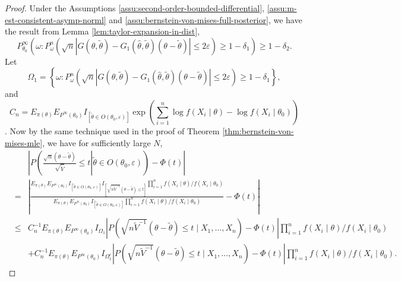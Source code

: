 \begin{proof}
Under the Assumptions \ref{assu:second-order-bounded-differential},
\ref{assu:m-est-consistent-asymp-norml} and \ref{assu:bernstein-von-mises-full-posterior},
we have the result from Lemma \ref{lem:taylor-expansion-in-dist},
\begin{equation}
P_{\theta_{0}}^{\infty}\left(\omega:P_{\omega}^{n}\left(\sqrt{n}\left|G\left(\theta,\tilde{\theta}\right)-G_{1}\left(\hat{\theta},\tilde{\theta}\right)\left(\theta-\tilde{\theta}\right)\right|\le2\varepsilon\right)\ge1-\delta_{1}\right)\ge1-\delta_{2}.\label{eq:conv-in-dist-reminder}
\end{equation}
Let \[\Omega_{1}=\left\{ \omega:P_{\omega}^{n}\left(\sqrt{n}\left|G\left(\theta,\tilde{\theta}\right)-G_{1}\left(\hat{\theta},\tilde{\theta}\right)\left(\theta-\tilde{\theta}\right)\right|\le2\varepsilon\right)\ge1-\delta_{1}\right\}, \] and 
\[C_{n}=E_{\pi\left(\theta\right)}E_{P^{\infty}\left(\theta_{0}\right)}I_{\left[\tilde{\theta}\in O\left(\theta_{0},\varepsilon\right)\right]}\exp\left(\sum_{i=1}^{n}\log f\left(X_{i}\mid\theta\right)-\log f\left(X_{i}\mid\theta_{0}\right)\right)\].
Now by the same technique used in the proof of Theorem \ref{thm:bernstein-von-mises-mle},
we have for sufficiently large $N$, 
\begin{eqnarray*}
 &  & \left|P\left(\left.\frac{\sqrt{n}\left(\theta-\tilde{\theta}\right)}{\sqrt{\tilde{V}}}\le t\right|\tilde{\theta}\in O\left(\theta_{0},\varepsilon\right)\right)-\Phi\left(t\right)\right|\\
 & = & \left|\frac{E_{\pi\left(\theta\right)}E_{P^{\infty}\left(\theta_{0}\right)}I_{\left[\tilde{\theta}\in O\left(\theta_{0},\varepsilon\right)\right]}I_{\left[\sqrt{n\tilde{V}^{-1}}\left(\theta-\tilde{\theta}\right)\le t\right]}\prod_{i=1}^{n}f\left(X_{i}\mid\theta\right)/f\left(X_{i}\mid\theta_{0}\right)}{E_{\pi\left(\theta\right)}E_{P^{\infty}\left(\theta_{0}\right)}I_{\left[\tilde{\theta}\in O\left(\theta_{0},\varepsilon\right)\right]}\prod_{i=1}^{n}f\left(X_{i}\mid\theta\right)/f\left(X_{i}\mid\theta_{0}\right)}-\Phi\left(t\right)\right|\\
 & \le & C_{n}^{-1}E_{\pi\left(\theta\right)}E_{P^{\infty}\left(\theta_{0}\right)}I_{\Omega_{1}}\left|P\left(\sqrt{n\tilde{V}^{-1}}\left(\theta-\tilde{\theta}\right)\le t\mid X_{1},\ldots,X_{n}\right)-\Phi\left(t\right)\right|\prod_{i=1}^{n}f\left(X_{i}\mid\theta\right)/f\left(X_{i}\mid\theta_{0}\right)\\
 &  & +C_{n}^{-1}E_{\pi\left(\theta\right)}E_{P^{\infty}\left(\theta_{0}\right)}I_{\Omega_{1}^{c}}\left|P\left(\sqrt{n\tilde{V}^{-1}}\left(\theta-\tilde{\theta}\right)\le t\mid X_{1},\ldots,X_{n}\right)-\Phi\left(t\right)\right|\prod_{i=1}^{n}f\left(X_{i}\mid\theta\right)/f\left(X_{i}\mid\theta_{0}\right).
\end{eqnarray*}



\end{proof}

